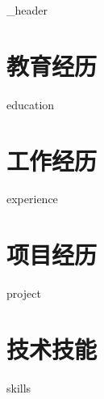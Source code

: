 \documentclass[letter,10pt]{article}
\author{李嘉梁}
\begin{document}
{_header}
\vspace*{10pt}

\section{\textbf{教育经历}}
{education}
\vspace*{10pt}

\section{\textbf{工作经历}}
{experience}
\vspace*{10pt}

\section{\textbf{项目经历}}
\vspace*{3pt}
{project}
\vspace*{10pt}

\section{\textbf{技术技能}}
\vspace*{3pt}
{skills}
\vspace*{10pt}
\end{document}
